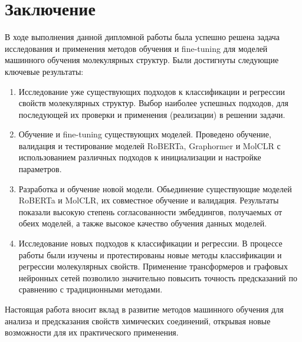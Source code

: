 \section{Заключение}
\label{sec:Chapter5} 

В ходе выполнения данной дипломной работы была успешно решена задача исследования и применения методов обучения и fine-tuning для моделей машинного обучения молекулярных структур. Были достигнуты следующие ключевые результаты:
\begin{enumerate}
    \item Исследование уже существующих подходов к классификации и регрессии свойств молекулярных структур. Выбор наиболее успешных подходов, для последующей их проверки и применения (реализации) в решении задачи.
    \item Обучение и fine-tuning существующих моделей. Проведено обучение, валидация и тестирование моделей RoBERTa, Graphormer и MolCLR с использованием различных подходов к инициализации и настройке параметров. 
    \item Разработка и обучение новой модели. Обьединение существующие моделей RoBERTa и MolCLR, их совместное обучение и валидация. Результаты показали высокую степень согласованности эмбеддингов, получаемых от обеих моделей, а также высокое качество обучения данных моделей.
    \item Исследование новых подходов к классификации и регрессии. В процессе работы были изучены и протестированы новые методы классификации и регрессии молекулярных свойств. Применение трансформеров и графовых нейронных сетей позволило значительно повысить точность предсказаний по сравнению с традиционными методами.
\end{enumerate}

Настоящая работа вносит вклад в развитие методов машинного обучения для анализа и предсказания свойств химических соединений, открывая новые возможности для их практического применения.
\newpage
